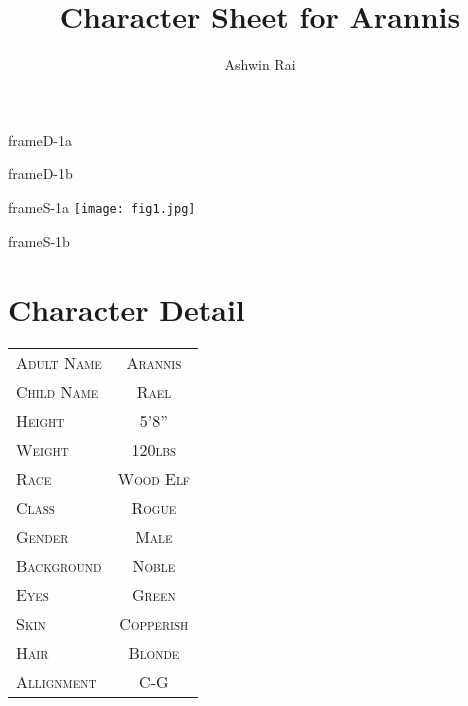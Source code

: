 \documentclass{article}
\title{Character Sheet for Arannis}
\author{Ashwin Rai }
\date{\relax}
\begin{document}
\pagestyle{empty}

\begin{dynamiccontents*}{frameD-1a}
\end{dynamiccontents*}

\begin{dynamiccontents*}{frameD-1b}
\end{dynamiccontents*}


\begin{staticcontents*}{frameS-1a}
\texttt{[image: fig1.jpg]}
\end{staticcontents*}

\begin{staticcontents*}{frameS-1b}
\end{staticcontents*}

\section{Character Detail}

\begin{table}[h]
\centering
\begin{tabular}{|| l | c ||}
\hline
\textsc{Adult Name} & \textsc{Arannis}\\
\textsc{Child Name} & \textsc{Rael}\\
\textsc{Height} & \textsc{5'8''}\\
\textsc{Weight }& \textsc{120lbs} \\
\textsc{Race}&   \textsc{Wood Elf}\\
\textsc{Class}&\textsc{Rogue}\\
\textsc{Gender}&\textsc{Male}\\
\textsc{Background}& \textsc{Noble}  \\
\textsc{Eyes} & \textsc{Green}\\
\textsc{Skin}&\textsc{Copperish}\\
\textsc{Hair}&\textsc{Blonde}\\
\textsc{Allignment}&\textsc{C-G}\\

\hline
\end{tabular}
\end{table}
\end{document}
